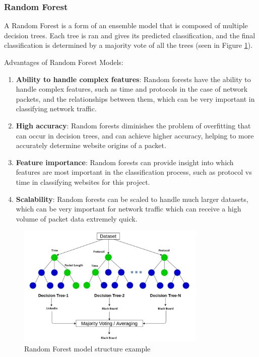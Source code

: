 \documentclass[10pt,sigconf,letterpaper,nonacm]{acmart}
\begin{document}
\subsubsection{Random Forest}
A Random Forest is a form of an ensemble model that is composed of multiple decision trees. Each tree is ran and gives its predicted classification, and the final classification is determined by a majority vote of all the trees (seen in Figure \ref{fig:RFExample}).

Advantages of Random Forest Models:
\begin{enumerate}
  \item \textbf{Ability to handle complex features}: Random forests have the ability to handle complex features, such as time and protocols in the case of network packets, and the relationships between them, which can be very important in classifying network traffic.
  \item \textbf{High accuracy}: Random forests diminishes the problem of overfitting that can occur in decision trees, and can achieve higher accuracy, helping to more accurately determine website origins of a packet.
  \item \textbf{Feature importance}: Random forests can provide insight into which features are most important in the classification process, such as protocol vs time in classifying websites for this project.
  \item \textbf{Scalability}: Random forests can be scaled to handle much larger datasets, which can be very important for network traffic which can receive a high volume of packet data extremely quick.
\end{enumerate}

\begin{figure}[!h]
  \centering
  \includegraphics[width=9cm]{Figures_and_Graphs/RandomForestExample.png}
  \caption{Random Forest model structure example}
  \label{fig:RFExample}
\end{figure}
\end{document}
